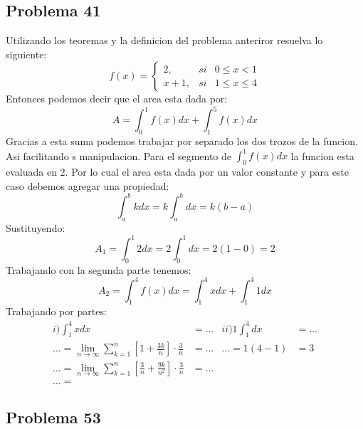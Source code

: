 \documentclass{article}
\begin{document}
      \subsection{Problema 41}
        Utilizando los teoremas y la definicion del problema anteriror resuelva lo siguiente:
        \begin{equation*}
          f(x) = \left\{
            \begin{array}{lcc}
              2, & si & 0\leq x < 1 \\
              x+1, & si & 1 \leq x \leq 4
            \end{array}
          \right.
        \end{equation*}
        Entonces podemos decir que el area esta dada por:
        \begin{equation}
          A = \int_{0}^{1} f(x)dx + \int_{1}^{5} f(x)dx
        \end{equation}
        Gracias a esta suma podemos trabajar por separado los dos trozos de la funcion. Asi facilitando s manipulacion.
        Para el segmento de $\int_{0}^{1}f(x)dx$ la funcion esta evaluada en 2. Por lo cual el area esta dada por un valor constante y para este caso debemos agregar una propiedad:
        \begin{equation}
          \int_{a}^{b}kdx = k\int_{a}^{b}dx = k(b-a)
        \end{equation}
        Sustituyendo:
        \begin{equation}
          A_1=\int_{0}^{1}2dx = 2\int_{0}^{1}dx = 2(1-0)=2
        \end{equation}
        Trabajando con la segunda parte tenemos:
        \begin{equation}
          A_2 = \int_{1}^{4} f(x)dx = \int_{1}^{4}xdx + \int_{1}^{4}1dx
        \end{equation}
        Trabajando por partes:
        \begin{align*}
          i) \int_{1}^{4}xdx&=\dots & ii) 1\int_{1}^{4}dx&= \dots \\ \dots=\lim_{n\to\infty} \sum_{k=1}^{n}\left[1+\frac{3k}{n}\right]\cdot\frac{3}{n}&=\dots & \dots = 1(4-1)&=3 \\
          \dots=\lim_{n\to\infty} \sum_{k=1}^{n}\left[\frac{3}{n}+\frac{9k}{n^2}\right]\cdot\frac{3}{n}&=\dots \\ \dots = 
        \end{align*}
      \subsection{Problema 53}
\end{document}
